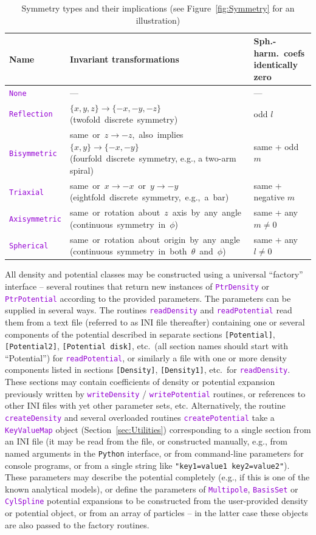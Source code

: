 \documentclass[12pt]{article}
\newcommand{\Python}{\texttt{Python}\xspace}
\newcommand{\ttt}[1]{\textcolor{darkviolet}{\texttt{#1}}}
\newcommand{\ppp}[1]{\textcolor{darkolive} {\texttt{#1}}}
\begin{document}
\begin{table}
\caption{Symmetry types and their implications (see Figure~\ref{fig:Symmetry} for an illustration)}  \label{tab:Symmetry}
\renewcommand{\arraystretch}{1.2}
\begin{tabular}{l m{9.2cm} m{3.5cm}}
Name & Invariant transformations & \mbox{Sph.-harm.~coefs} identically zero \\
\hline
\ttt{None} & --- & --- \\
\ttt{Reflection} & \mbox{$\{x,y,z\} \to \{-x,-y,-z\}$} \mbox{(twofold discrete symmetry)} & odd $l$ \\
\ttt{Bisymmetric} & \mbox{same or $z \to -z$, also implies $\{x,y\} \to \{-x,-y\}$} \mbox{(fourfold discrete symmetry}, e.g., a two-arm spiral) & same + odd $m$ \\
\ttt{Triaxial} & \mbox{same or $x \to -x$ or $y \to -y$} \mbox{(eightfold discrete symmetry, e.g., a bar)} & same + negative $m$ \\
\ttt{Axisymmetric} & \mbox{same or rotation about $z$ axis by any angle} \mbox{(continuous symmetry in $\phi$)} & same + any $m \ne 0$ \\
\ttt{Spherical} & \mbox{same or rotation about origin by any angle} \mbox{(continuous symmetry in both $\theta$ and $\phi$)} & same + any $l \ne 0$
\end{tabular}
\end{table}

All density and potential classes may be constructed using a universal ``factory'' interface -- several routines that return new instances of \ttt{PtrDensity} or \ttt{PtrPotential} according to the provided parameters.
The parameters can be supplied in several ways. The routines \ttt{readDensity} and \ttt{readPotential} read them from a text file (referred to as INI file thereafter) containing one or several components of the potential described in separate sections \ppp{[Potential]}, \ppp{[Potential2]}, \ppp{[Potential disk]}, etc.\ (all section names should start with ``Potential'') for \ttt{readPotential}, or similarly a file with one or more density components listed in sections \ppp{[Density]}, \ppp{[Density1]}, etc.\ for \ttt{readDensity}. These sections may contain coefficients of density or potential expansion previously written by \ttt{writeDensity} / \ttt{writePotential} routines, or references to other INI files with yet other parameter sets, etc.
Alternatively, the routine \ttt{createDensity} and several overloaded routines \ttt{createPotential} take a \ttt{KeyValueMap} object (Section~\ref{sec:Utilities}) corresponding to a single section from an INI file (it may be read  from the file, or constructed manually, e.g., from named arguments in the \Python interface, or from command-line parameters for console programs, or from a single string like \ppp{"key1=value1 key2=value2"}). These parameters may describe the potential completely (e.g., if this is one of the known analytical models), or define the parameters of \ttt{Multipole}, \ttt{BasisSet} or \ttt{CylSpline} potential expansions to be constructed from the user-provided density or potential object, or from an array of particles -- in the latter case these objects are also passed to the factory routines. 
\end{document}
